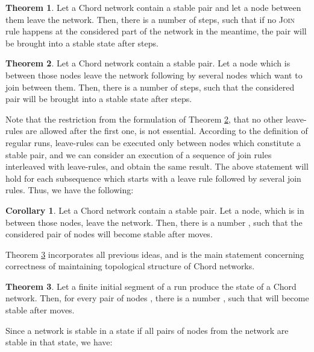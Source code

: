 \documentclass{amsart}
\theoremstyle{definition}
\newtheorem{theorem}{Theorem}[section]
\newtheorem{corollary}{Corollary}[section]
\begin{document}
\begin{theorem}\label{stabthl}
Let a Chord network contain a stable pair and let a node between them leave the network.
Then, there is a number  of steps, such that if no
\textsc{Join} rule happens at the considered part of the network
in the meantime,
the pair will be brought into a stable state after  steps.
\end{theorem}

\begin{theorem}\label{stab_mix_join_leave}
Let a Chord network contain a stable pair. Let a node which is
between those nodes leave the network following by several nodes
which want to join between them.
Then, there is a number  of steps, such that
the considered pair will be brought into a stable state after 
steps.
\end{theorem}

Note that the restriction from the formulation of Theorem \ref{stab_mix_join_leave}, that no other leave-rules are allowed after the
first one, is not essential. According to the definition of regular runs, leave-rules can be executed only between nodes which constitute a stable pair, and we
can consider an execution of a sequence of join rules interleaved with leave-rules, and obtain the same result. The above statement
will hold for each subsequence which starts with a leave rule followed by several join rules. Thus, we have the following:




\begin{corollary} \label{cor3}
Let a Chord network contain a stable pair. Let a node, which is in between those nodes, leave the network.
Then, there is a number , such that
the considered pair of nodes will become stable after 
moves.
\end{corollary}




Theorem \ref{chord_cycle} incorporates all previous ideas, and is the main statement concerning correctness of maintaining topological
structure of Chord networks.


\begin{theorem}\label{chord_cycle}
Let a finite initial segment of a run produce the state  of a
Chord network. Then, for every pair of nodes ,
there is a number , such that
 will become stable after  moves.
\end{theorem}

Since a network is stable in a state if all pairs of nodes from
the network are stable in that state, we have:
\end{document}
